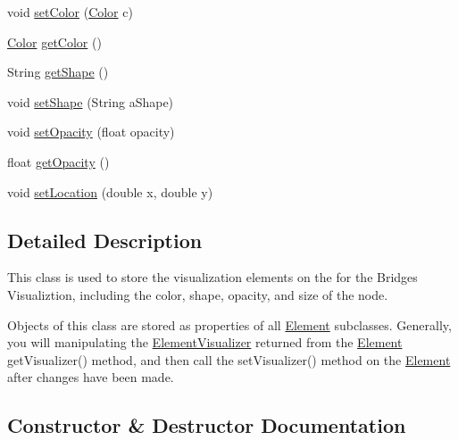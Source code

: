 \begin{DoxyCompactItemize}
void \hyperlink{classbridges_1_1base_1_1_element_visualizer_a33172ab908f3b6f9740727b0bfe91565}{set\+Color} (\hyperlink{classbridges_1_1base_1_1_color}{Color} c)
\item 
\hyperlink{classbridges_1_1base_1_1_color}{Color} \hyperlink{classbridges_1_1base_1_1_element_visualizer_a3bf821b9bfa02746882bac934ce4fb8e}{get\+Color} ()
\item 
String \hyperlink{classbridges_1_1base_1_1_element_visualizer_a8ef0825745e49f32b57e4bf6c891b57e}{get\+Shape} ()
\item 
void \hyperlink{classbridges_1_1base_1_1_element_visualizer_ac3bad991904c8ad23e5233b341381d93}{set\+Shape} (String a\+Shape)
\item 
void \hyperlink{classbridges_1_1base_1_1_element_visualizer_a932f62eb1bd0c92da265a7f903dd0790}{set\+Opacity} (float opacity)
\item 
float \hyperlink{classbridges_1_1base_1_1_element_visualizer_ab86ff39f17f8d1766670b18be88b5492}{get\+Opacity} ()
\item 
void \hyperlink{classbridges_1_1base_1_1_element_visualizer_a04f3416447f2042de7cd21ce5b6a0598}{set\+Location} (double x, double y)
\end{DoxyCompactItemize}


\subsection{Detailed Description}
This class is used to store the visualization elements on the for the Bridges Visualiztion, including the color, shape, opacity, and size of the node. 

Objects of this class are stored as properties of all \hyperlink{classbridges_1_1base_1_1_element}{Element} subclasses. Generally, you will manipulating the \hyperlink{classbridges_1_1base_1_1_element_visualizer}{Element\+Visualizer} returned from the \hyperlink{classbridges_1_1base_1_1_element}{Element} get\+Visualizer() method, and then call the set\+Visualizer() method on the \hyperlink{classbridges_1_1base_1_1_element}{Element} after changes have been made. 

\subsection{Constructor \& Destructor Documentation}
\hypertarget{classbridges_1_1base_1_1_element_visualizer_acbca874876ec1e8dbbde6484a4fc056e}{}
